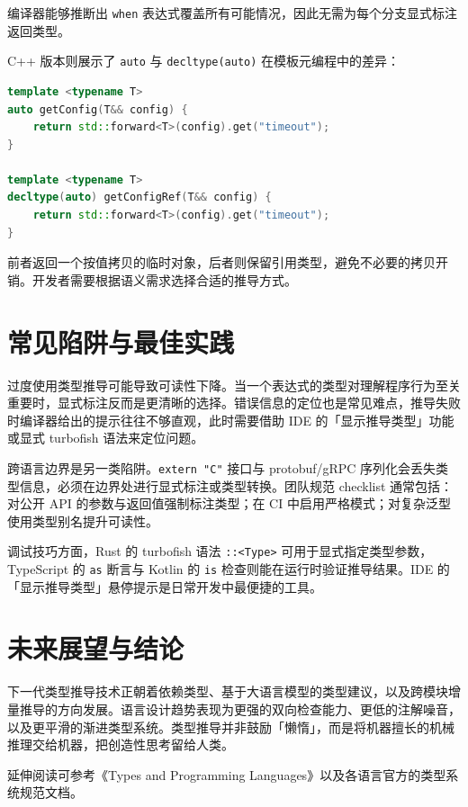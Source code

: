 编译器能够推断出 \texttt{when} 表达式覆盖所有可能情况，因此无需为每个分支显式标注返回类型。\par
C++ 版本则展示了 \texttt{auto} 与 \texttt{decltype(auto)} 在模板元编程中的差异：\par
\begin{lstlisting}[language=cpp]
template <typename T>
auto getConfig(T&& config) {
    return std::forward<T>(config).get("timeout");
}

template <typename T>
decltype(auto) getConfigRef(T&& config) {
    return std::forward<T>(config).get("timeout");
}
\end{lstlisting}
前者返回一个按值拷贝的临时对象，后者则保留引用类型，避免不必要的拷贝开销。开发者需要根据语义需求选择合适的推导方式。\par
\chapter{常见陷阱与最佳实践}
过度使用类型推导可能导致可读性下降。当一个表达式的类型对理解程序行为至关重要时，显式标注反而是更清晰的选择。错误信息的定位也是常见难点，推导失败时编译器给出的提示往往不够直观，此时需要借助 IDE 的「显示推导类型」功能或显式 turbofish 语法来定位问题。\par
跨语言边界是另一类陷阱。\texttt{extern "C"} 接口与 protobuf/gRPC 序列化会丢失类型信息，必须在边界处进行显式标注或类型转换。团队规范 checklist 通常包括：对公开 API 的参数与返回值强制标注类型；在 CI 中启用严格模式；对复杂泛型使用类型别名提升可读性。\par
调试技巧方面，Rust 的 turbofish 语法 \texttt{::<Type>} 可用于显式指定类型参数，TypeScript 的 \texttt{as} 断言与 Kotlin 的 \texttt{is} 检查则能在运行时验证推导结果。IDE 的「显示推导类型」悬停提示是日常开发中最便捷的工具。\par
\chapter{未来展望与结论}
下一代类型推导技术正朝着依赖类型、基于大语言模型的类型建议，以及跨模块增量推导的方向发展。语言设计趋势表现为更强的双向检查能力、更低的注解噪音，以及更平滑的渐进类型系统。类型推导并非鼓励「懒惰」，而是将机器擅长的机械推理交给机器，把创造性思考留给人类。\par
延伸阅读可参考《Types and Programming Languages》以及各语言官方的类型系统规范文档。\par
